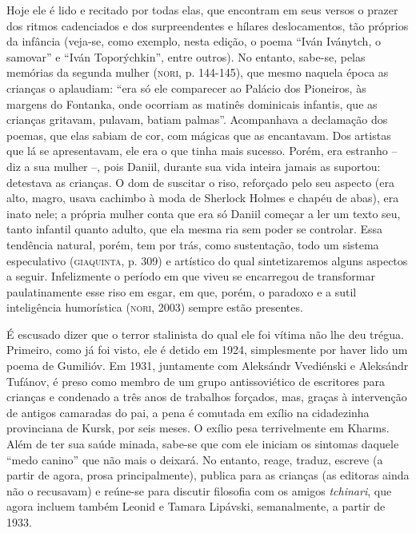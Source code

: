 Hoje ele é lido e recitado por todas elas, que encontram em seus versos
o prazer dos ritmos cadenciados e dos surpreendentes e hílares
deslocamentos, tão próprios da infância (veja-se, como exemplo, nesta
edição, o poema ``Iván Iványtch, o samovar'' e ``Iván Toporýchkin'',
entre outros). No entanto, sabe-se, pelas memórias da segunda mulher
(\textsc{nori}, p. 144-145), que mesmo naquela época as crianças o
aplaudiam: ``era só ele comparecer ao Palácio dos Pioneiros, às margens
do Fontanka, onde ocorriam as matinês dominicais infantis, que as
crianças gritavam, pulavam, batiam palmas''. Acompanhava a declamação
dos poemas, que elas sabiam de cor, com mágicas que as encantavam. Dos
artistas que lá se apresentavam, ele era o que tinha mais sucesso.
Porém, era estranho -- diz a sua mulher --, pois Daniil, durante sua
vida inteira jamais as suportou: detestava as crianças. O dom de
suscitar o riso, reforçado pelo seu aspecto (era alto, magro, usava
cachimbo à moda de Sherlock Holmes e chapéu de abas), era inato nele; a
própria mulher conta que era só Daniil começar a ler um texto seu, tanto
infantil quanto adulto, que ela mesma ria sem poder se controlar. Essa
tendência natural, porém, tem por trás, como sustentação, todo um
sistema especulativo (\textsc{giaquinta}, p. 309) e artístico do qual
sintetizaremos alguns aspectos a seguir. Infelizmente o período em que
viveu se encarregou de transformar paulatinamente esse riso em esgar, em
que, porém, o paradoxo e a sutil inteligência humorística
(\textsc{nori}, 2003) sempre estão presentes.

É escusado dizer que o terror stalinista do qual ele foi vítima não lhe
deu trégua. Primeiro, como já foi visto, ele é detido em 1924,
simplesmente por haver lido um poema de Gumilióv. Em 1931, juntamente
com Aleksándr Vvediénski e Aleksándr Tufánov, é preso como membro de um
grupo antissoviético de escritores para crianças e condenado a três anos
de trabalhos forçados, mas, graças à intervenção de antigos camaradas do
pai, a pena é comutada em exílio na cidadezinha provinciana de Kursk,
por seis meses. O exílio pesa terrivelmente em Kharms. Além de ter sua
saúde minada, sabe-se que com ele iniciam os sintomas daquele ``medo
canino'' que não mais o deixará. No entanto, reage, traduz, escreve (a
partir de agora, prosa principalmente), publica para as crianças (as
editoras ainda não o recusavam) e reúne-se para discutir filosofia com
os amigos \emph{tchinari}, que agora incluem também Leonid e Tamara
Lipávski, semanalmente, a partir de 1933.

